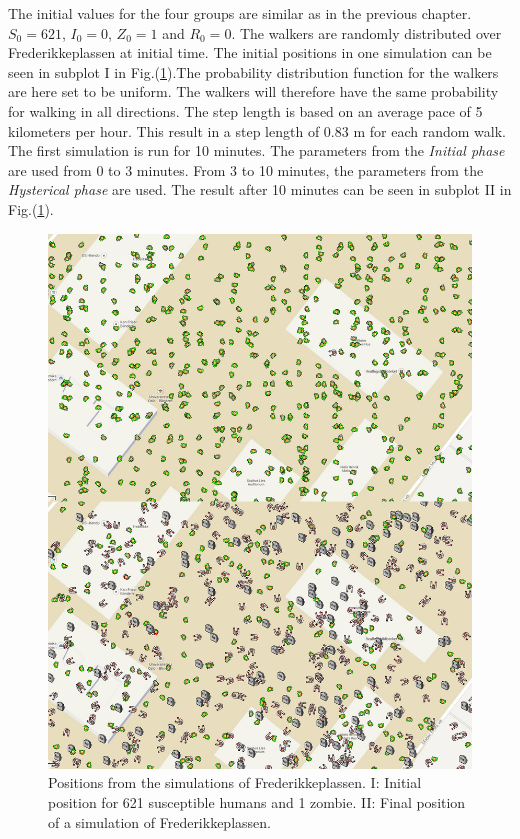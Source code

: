 \documentclass[%
twoside,                 %
final,                   %
chapterprefix=true,      %
open=right               %
10pt]{book}
\begin{document}
The initial values for the four groups are similar as in the previous chapter. $S_0 = 621$, $I_0 = 0$, $Z_0 = 1$ and $R_0 = 0$. The walkers are randomly distributed over Frederikkeplassen at initial time. The initial positions in one simulation can be seen in subplot I in Fig.(\ref{fig:initial_final}).The probability distribution function for the walkers are here set to be uniform. The walkers will therefore have the same probability for walking in all directions. The step length is based on an average pace of 5 kilometers per hour. This result in a step length of 0.83 m for each random walk. The first simulation is run for 10 minutes. The parameters from the \emph{Initial phase} are used from 0 to 3 minutes. From 3 to 10 minutes, the parameters from the \emph{Hysterical phase} are used. The result after 10 minutes can be seen in subplot II in Fig.(\ref{fig:initial_final}). 


\begin{figure}[ht]
  \centerline{\includegraphics[width=0.8\linewidth]{3_fig/Frederikke_initial_final.png}}
  \caption{
  \label{fig:initial_final} Positions from the simulations of Frederikkeplassen. I: Initial position for 621 susceptible humans and 1 zombie. II: Final position of a simulation of Frederikkeplassen.
  }
\end{figure}
\end{document}
